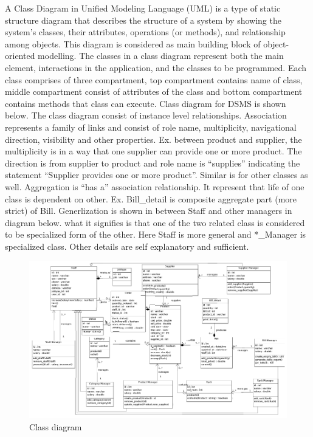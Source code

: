 A Class Diagram in Unified Modeling Language (UML) is a type of static
structure diagram that describes the structure of a system by showing the
system's classes, their attributes, operations (or methods), and relationship
among objects. This diagram is considered as main building block of
object-oriented modelling. The classes in a class diagram represent both the
main element, interactions in the application,  and the classes to be
programmed. Each class comprises of three compartment, top compartment contains
name of class, middle compartment consist of attributes of the class and bottom
compartment contains methods that class can execute. Class diagram for DSMS is
shown below. The class diagram consist of instance level relationships.
Association represents a family of links and consist of role name,
multiplicity, navigational direction, visibility and other properties. Ex.
between product and supplier, the multiplicity is in a way that one supplier
can provide one or more product. The direction is from supplier to product and
role name is ``supplies'' indicating the statement ``Supplier provides one or
more product''. Similar is for other classes as well. Aggregation is ``has a''
association relationship. It represent that life of one class is dependent on
other. Ex. Bill\_detail is composite aggregate part (more strict) of Bill.
Generlization is shown in between Staff and other managers in diagram below.
what it signifies is that one of the two related class is considered to be
specialized form of the other. Here Staff is more general and *\_Manager is
specialized class. Other details are self explanatory and sufficient.



\begin{figure}[h]\centering
  \includegraphics[width=\textwidth]{fig/class}
  \caption{Class diagram}\label{fig:class}
\end{figure}


